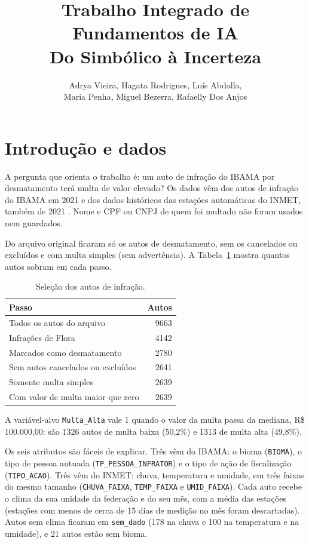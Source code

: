 \documentclass[11pt]{article}
\title{Trabalho Integrado de Fundamentos de IA\\ \large Do Simbólico à Incerteza}
\author{Adrya Vieira, Hagata Rodrigues, Luís Abdalla, \\
Maria Penha, Miguel Bezerra, Rafaelly Dos Anjos}
\date{}
\begin{document}
\maketitle

\section{Introdução e dados}
A pergunta que orienta o trabalho é: um auto de infração do IBAMA por desmatamento terá multa de valor elevado? Os dados vêm dos autos de infração do IBAMA em 2021 \cite{ibama2021} e dos dados históricos das estações automáticas do INMET, também de 2021 \cite{inmet2021}. Nome e CPF ou CNPJ de quem foi multado não foram usados nem guardados.

Do arquivo original ficaram só os autos de desmatamento, sem os cancelados ou excluídos e com multa simples (sem advertência). A Tabela~\ref{tab:funil} mostra quantos autos sobram em cada passo.

\begin{table}[H]
\centering
\begin{tabular}{lr}
\toprule
Passo & Autos \\
\midrule
Todos os autos do arquivo & 9663 \\
Infrações de Flora & 4142 \\
Marcados como desmatamento & 2780 \\
Sem autos cancelados ou excluídos & 2641 \\
Somente multa simples & 2639 \\
Com valor de multa maior que zero & 2639 \\
\bottomrule
\end{tabular}
\caption{Seleção dos autos de infração.}
\label{tab:funil}
\end{table}

A variável-alvo \texttt{Multa\_Alta} vale 1 quando o valor da multa passa da mediana, R\$ 100.000,00: são 1326 autos de multa baixa (50,2\%) e 1313 de multa alta (49,8\%).

Os seis atributos são fáceis de explicar. Três vêm do IBAMA: o bioma (\texttt{BIOMA}), o tipo de pessoa autuada (\texttt{TP\_PESSOA\_INFRATOR}) e o tipo de ação de fiscalização (\texttt{TIPO\_ACAO}). Três vêm do INMET: chuva, temperatura e umidade, em três faixas do mesmo tamanho (\texttt{CHUVA\_FAIXA}, \texttt{TEMP\_FAIXA} e \texttt{UMID\_FAIXA}). Cada auto recebe o clima da sua unidade da federação e do seu mês, com a média das estações (estações com menos de cerca de 15 dias de medição no mês foram descartadas). Autos sem clima ficaram em \texttt{sem\_dado} (178 na chuva e 100 na temperatura e na umidade), e 21 autos estão sem bioma.
\end{document}
